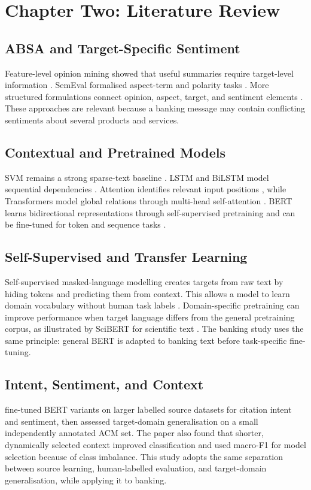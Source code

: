 \documentclass[11pt,a4paper]{article}
\begin{document}
\clearpage
\section{Chapter Two: Literature Review}
\subsection{ABSA and Target-Specific Sentiment}
Feature-level opinion mining showed that useful summaries require target-level information \citep{hu2004}. SemEval formalised aspect-term and polarity tasks \citep{pontiki2014}. More structured formulations connect opinion, aspect, target, and sentiment elements \citep{chebolu2023}. These approaches are relevant because a banking message may contain conflicting sentiments about several products and services.

\subsection{Contextual and Pretrained Models}
SVM remains a strong sparse-text baseline \citep{cortes1995}. LSTM and BiLSTM model sequential dependencies \citep{hochreiter1997,schuster1997}. Attention identifies relevant input positions \citep{bahdanau2015}, while Transformers model global relations through multi-head self-attention \citep{vaswani2017}. BERT learns bidirectional representations through self-supervised pretraining and can be fine-tuned for token and sequence tasks \citep{devlin2019}.

\subsection{Self-Supervised and Transfer Learning}
Self-supervised masked-language modelling creates targets from raw text by hiding tokens and predicting them from context. This allows a model to learn domain vocabulary without human task labels \citep{devlin2019}. Domain-specific pretraining can improve performance when target language differs from the general pretraining corpus, as illustrated by SciBERT for scientific text \citep{beltagy2019}. The banking study uses the same principle: general BERT is adapted to banking text before task-specific fine-tuning.

\subsection{Intent, Sentiment, and Context}
\citet{visser2022} fine-tuned BERT variants on larger labelled source datasets for citation intent and sentiment, then assessed target-domain generalisation on a small independently annotated ACM set. The paper also found that shorter, dynamically selected context improved classification and used macro-F1 for model selection because of class imbalance. This study adopts the same separation between source learning, human-labelled evaluation, and target-domain generalisation, while applying it to banking.
\end{document}
